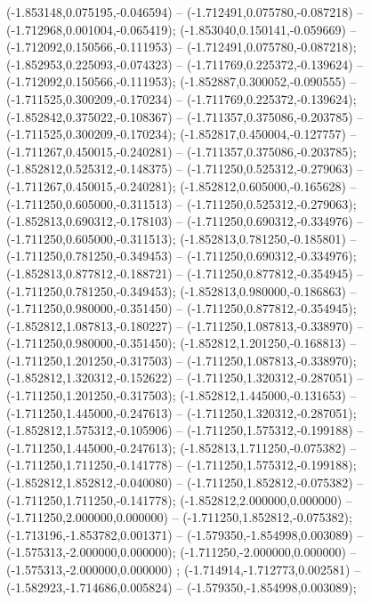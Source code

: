  (-1.853148,0.075195,-0.046594) -- (-1.712491,0.075780,-0.087218) -- (-1.712968,0.001004,-0.065419);
 (-1.853040,0.150141,-0.059669) -- (-1.712092,0.150566,-0.111953) -- (-1.712491,0.075780,-0.087218);
 (-1.852953,0.225093,-0.074323) -- (-1.711769,0.225372,-0.139624) -- (-1.712092,0.150566,-0.111953);
 (-1.852887,0.300052,-0.090555) -- (-1.711525,0.300209,-0.170234) -- (-1.711769,0.225372,-0.139624);
 (-1.852842,0.375022,-0.108367) -- (-1.711357,0.375086,-0.203785) -- (-1.711525,0.300209,-0.170234);
 (-1.852817,0.450004,-0.127757) -- (-1.711267,0.450015,-0.240281) -- (-1.711357,0.375086,-0.203785);
 (-1.852812,0.525312,-0.148375) -- (-1.711250,0.525312,-0.279063) -- (-1.711267,0.450015,-0.240281);
 (-1.852812,0.605000,-0.165628) -- (-1.711250,0.605000,-0.311513) -- (-1.711250,0.525312,-0.279063);
 (-1.852813,0.690312,-0.178103) -- (-1.711250,0.690312,-0.334976) -- (-1.711250,0.605000,-0.311513);
 (-1.852813,0.781250,-0.185801) -- (-1.711250,0.781250,-0.349453) -- (-1.711250,0.690312,-0.334976);
 (-1.852813,0.877812,-0.188721) -- (-1.711250,0.877812,-0.354945) -- (-1.711250,0.781250,-0.349453);
 (-1.852813,0.980000,-0.186863) -- (-1.711250,0.980000,-0.351450) -- (-1.711250,0.877812,-0.354945);
 (-1.852812,1.087813,-0.180227) -- (-1.711250,1.087813,-0.338970) -- (-1.711250,0.980000,-0.351450);
 (-1.852812,1.201250,-0.168813) -- (-1.711250,1.201250,-0.317503) -- (-1.711250,1.087813,-0.338970);
 (-1.852812,1.320312,-0.152622) -- (-1.711250,1.320312,-0.287051) -- (-1.711250,1.201250,-0.317503);
 (-1.852812,1.445000,-0.131653) -- (-1.711250,1.445000,-0.247613) -- (-1.711250,1.320312,-0.287051);
 (-1.852812,1.575312,-0.105906) -- (-1.711250,1.575312,-0.199188) -- (-1.711250,1.445000,-0.247613);
 (-1.852813,1.711250,-0.075382) -- (-1.711250,1.711250,-0.141778) -- (-1.711250,1.575312,-0.199188);
 (-1.852812,1.852812,-0.040080) -- (-1.711250,1.852812,-0.075382) -- (-1.711250,1.711250,-0.141778);
 (-1.852812,2.000000,0.000000) -- (-1.711250,2.000000,0.000000) -- (-1.711250,1.852812,-0.075382);
 (-1.713196,-1.853782,0.001371) -- (-1.579350,-1.854998,0.003089) -- (-1.575313,-2.000000,0.000000);
 (-1.711250,-2.000000,0.000000) -- (-1.575313,-2.000000,0.000000) ;
 (-1.714914,-1.712773,0.002581) -- (-1.582923,-1.714686,0.005824) -- (-1.579350,-1.854998,0.003089);
